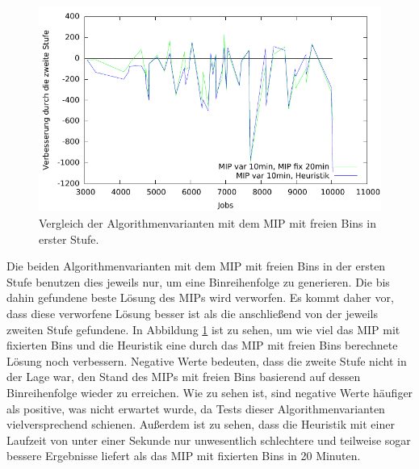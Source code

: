 \documentclass{scrreprt}
\begin{document}
\begin{figure}
    \begin{center}
        \includegraphics[width=.8\textwidth]{../prog/binpacking/results/kbplotmipdiffn.pdf}
    \end{center}
    \caption{
        \label{abb:kbplotmipdiffn}
        Vergleich der Algorithmenvarianten mit dem MIP mit freien Bins in erster Stufe.
    }
\end{figure}
Die beiden Algorithmenvarianten mit dem MIP mit freien Bins in der ersten Stufe benutzen dies jeweils nur, um eine Binreihenfolge zu generieren.
Die bis dahin gefundene beste Lösung des MIPs wird verworfen.
Es kommt daher vor, dass diese verworfene Lösung besser ist als die anschließend von der jeweils zweiten Stufe gefundene.
In Abbildung \ref{abb:kbplotmipdiffn} ist zu sehen, um wie viel das MIP mit fixierten Bins und die Heuristik 
eine durch das MIP mit freien Bins berechnete Lösung noch verbessern.
Negative Werte bedeuten, dass die zweite Stufe nicht in der Lage war, den Stand des MIPs mit freien Bins basierend auf dessen Binreihenfolge wieder zu erreichen.
Wie zu sehen ist, sind negative Werte häufiger als positive, was nicht erwartet wurde, 
da Tests dieser Algorithmenvarianten vielversprechend schienen.
Außerdem ist zu sehen, dass die Heuristik mit einer Laufzeit von unter einer Sekunde nur unwesentlich schlechtere und teilweise sogar bessere Ergebnisse liefert als 
das MIP mit fixierten Bins in 20 Minuten.
\end{document}
